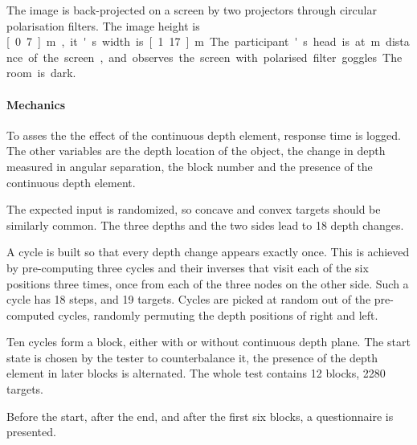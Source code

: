The image is back-projected on a screen by two projectors through circular polarisation filters. The image height is \unit[0.7]{m}, it's width is \unit[1.17]{m}. The participant's head is at \unit[1]{m} distance of the screen, and observes the screen with polarised filter goggles. The room is dark.

\paragraph{Mechanics}
To asses the the effect of the continuous depth element, response time is logged. The other variables are the depth location of the object, the change in depth measured in angular separation, the block number and the presence of the continuous depth element.

The expected input is randomized, so concave and convex targets should be similarly common. The three depths and the two sides lead to 18 depth changes.

A cycle is built so that every depth change appears exactly once. This is achieved by pre-computing three cycles and their inverses that visit each of the six positions three times, once from each of the three nodes on the other side. Such a cycle has 18 steps, and 19 targets.
Cycles are picked at random out of the pre-computed cycles, randomly permuting the depth positions of right and left.

Ten cycles form a block, either with or without continuous depth plane. The start state is chosen by the tester to counterbalance it, the presence of the depth element in later blocks is alternated.
The whole test contains 12 blocks, 2280 targets.

Before the start, after the end, and after the first six blocks, a questionnaire is presented.

